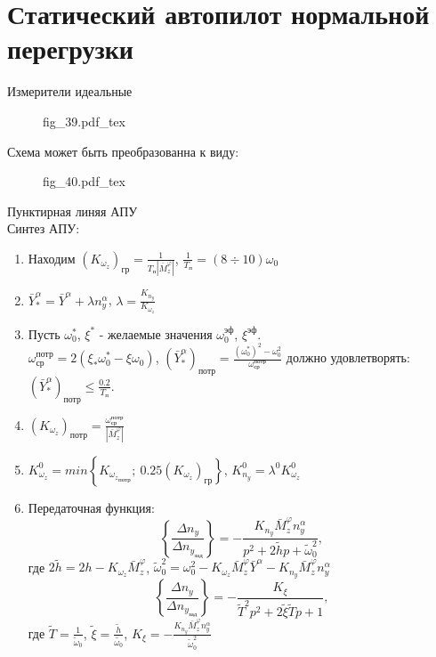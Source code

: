 \documentclass{article}
\begin{document}
\section{Статический автопилот нормальной перегрузки}
Измерители идеальные 
\begin{figure}[H]
	\centering
	{fig_39.pdf_tex}
\end{figure}

Схема может быть преобразованна к виду:

\begin{figure}[H]
	\centering
	{fig_40.pdf_tex}
\end{figure}

Пунктирная линяя АПУ\\
Синтез АПУ:
\begin{enumerate}
	\item Находим $(K_{\omega_z})_\text{гр} =\frac{1}{T_\text{п} |\bar{M}_z^{\varphi}|}$, $\frac{1}{T_\text{п}} = (8 \div 10)\omega_0$
	\item $\bar{Y}_*^\alpha =\bar{Y}^\alpha + \lambda n_y^\alpha$, $\lambda = \frac{K_{n_y}}{K_{\omega_z}}$
	\item Пусть $\omega_0^*$, $\xi^*$ - желаемые значения $\omega_0^{\text{эф}}$, $\xi^{\text{эф}}$.\\
	      $\omega_\text{ср}^\text{потр} = 2 (\xi_* \omega_0^* - \xi \omega_0)$, $(\bar{Y}_*^\alpha)_\text{потр} = \frac{(\omega_0^*)^2 - \omega_0^2}{\omega_\text{ср}^\text{потр}}$
	      должно удовлетворять: $(\bar{Y}_*^\alpha)_\text{потр} \leq \frac{0.2}{T_\text{п}}$.
	\item $(K_{\omega_z})_\text{потр} = \frac{\omega_\text{ср}^\text{потр}}{|\bar{M}_z^\varphi|}$
	\item $K_{\omega_z}^0 = min \left\{ K_{{\omega_z}_\text{потр}};\ 0.25(K_{\omega_z})_\text{гр} \right\}$, $K_{n_y}^0 = \lambda^0 K_{\omega_z}^0$
	\item Передаточная функция:
	      \[
		      \left\{\frac{\Delta n_y}{\Delta n_{y_\text{зад}}} \right\}  = -\frac{K_{n_y}\bar{M}_z^\varphi n_y^\alpha }{p^2 + 2 \tilde{h} p + \tilde{\omega}_0^2},
	      \]
	      где $2 \tilde{h} = 2h - K_{\omega_z} \bar{M}_z^\varphi$, $\tilde{\omega}^{2}_0= \omega_0^2 - K_{\omega_z} \bar{M}_z^\varphi \bar{Y}^\alpha - K_{n_y} \bar{M}_z^\varphi n_y^\alpha$
	      \[
		      \left\{\frac{\Delta n_y}{\Delta n_{y_\text{зад}}} \right\} = -\frac{K_{\xi}}{\tilde{T}^2 p^2 + 2 \tilde{\xi} \tilde{T}p + 1}, 
	      \]
	      где $\tilde{T} = \frac{1}{\tilde{\omega}_0}$, $\tilde{\xi} =\frac{\tilde{h}}{\tilde{\omega_{0}}}$, $K_\xi = -\frac{K_{n_y} \bar{M}_z^\varphi n_y^\alpha}{\tilde{\omega}_0^2}$
\end{enumerate}
\end{document}
